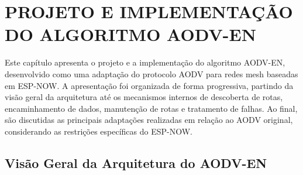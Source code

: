 \chapter{PROJETO E IMPLEMENTAÇÃO DO ALGORITMO
AODV-EN}\label{cap:implementacao}\label{projeto-e-implementauxe7uxe3o-do-algoritmo-aodv-en}

Este capítulo apresenta o projeto e a implementação do algoritmo
AODV-EN, desenvolvido como uma adaptação do protocolo AODV para redes
mesh baseadas em ESP-NOW. A apresentação foi organizada de forma
progressiva, partindo da visão geral da arquitetura até os mecanismos
internos de descoberta de rotas, encaminhamento de dados, manutenção de
rotas e tratamento de falhas. Ao final, são discutidas as principais
adaptações realizadas em relação ao AODV original, considerando as
restrições específicas do ESP-NOW.

\section{Visão Geral da Arquitetura do AODV-EN}\label{visao-geral-da-arquitetura-do-aodv-en}

